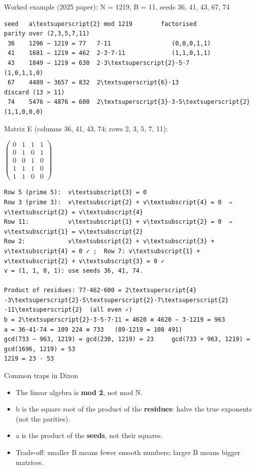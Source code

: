 \documentclass[11pt,a4paper]{article}
\begin{document}
\begin{example}{Worked example (2025 paper): N = 1219, B = 11, seeds 36, 41, 43, 67, 74}
\begin{workbox}
\begin{Verbatim}[commandchars=\\\{\},fontsize=\footnotesize]
seed   a\textsuperscript{2} mod 1219        factorised           parity over (2,3,5,7,11)
 36    1296 − 1219 = 77   7·11                 (0,0,0,1,1)
 41    1681 − 1219 = 462  2·3·7·11             (1,1,0,1,1)
 43    1849 − 1219 = 630  2·3\textsuperscript{2}·5·7             (1,0,1,1,0)
 67    4489 − 3657 = 832  2\textsuperscript{6}·13               discard (13 > 11)
 74    5476 − 4876 = 600  2\textsuperscript{3}·3·5\textsuperscript{2}              (1,1,0,0,0)
\end{Verbatim}
\end{workbox}
Matrix E (columns 36, 41, 43, 74; rows 2, 3, 5, 7, 11):\par
\ensuremath{\begin{pmatrix}0&1&1&1\\0&1&0&1\\0&0&1&0\\1&1&1&0\\1&1&0&0\end{pmatrix}}\par
\begin{workbox}
\begin{Verbatim}[commandchars=\\\{\},fontsize=\scriptsize]
Row 5 (prime 5):  v\textsubscript{3} = 0
Row 3 (prime 3):  v\textsubscript{2} + v\textsubscript{4} = 0  ⇒ v\textsubscript{2} = v\textsubscript{4}
Row 11:           v\textsubscript{1} + v\textsubscript{2} = 0  ⇒ v\textsubscript{1} = v\textsubscript{2}
Row 2:            v\textsubscript{2} + v\textsubscript{3} + v\textsubscript{4} = 0 ✓ ;  Row 7: v\textsubscript{1} + v\textsubscript{2} + v\textsubscript{3} = 0 ✓
v = (1, 1, 0, 1): use seeds 36, 41, 74.

Product of residues: 77·462·600 = 2\textsuperscript{4}·3\textsuperscript{2}·5\textsuperscript{2}·7\textsuperscript{2}·11\textsuperscript{2}  (all even ✓)
b = 2\textsuperscript{2}·3·5·7·11 = 4620 ≡ 4620 − 3·1219 = 963
a = 36·41·74 = 109 224 ≡ 733   (89·1219 = 108 491)
gcd(733 − 963, 1219) = gcd(230, 1219) = 23     gcd(733 + 963, 1219) = gcd(1696, 1219) = 53
1219 = 23 · 53
\end{Verbatim}
\end{workbox}
\end{example}
\begin{trap}{Common traps in Dixon}
\begin{itemize}
\item The linear algebra is \textbf{mod 2}, not mod N.
\item b is the square root of the product of the \textbf{residues}: halve the true exponents (not the parities).
\item a is the product of the \textbf{seeds}, not their squares.
\item Trade-off: smaller B means fewer smooth numbers; larger B means bigger matrices.
\end{itemize}
\end{trap}
\end{document}
